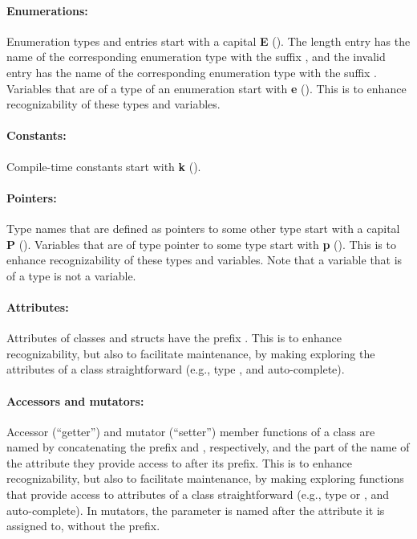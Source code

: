 \documentclass[footinclude=false,11pt,DIV11]{scrartcl}
\begin{document}
\paragraph{Enumerations:} Enumeration types and entries start with a capital
\textbf{E} (\Etype). The length entry has the name of the corresponding enumeration
type with the suffix , and the invalid entry has the name of the
corresponding enumeration type with the suffix . Variables that are of a
type of an enumeration start with \textbf{e} (\etype). This is to enhance
recognizability of these types and variables.

\paragraph{Constants:} Compile-time constants start with \textbf{k} (\ktype).

\paragraph{Pointers:} Type names that are defined as pointers to some other type start
with a capital \textbf{P} (\Ptype). Variables that are of type pointer to some
type start with \textbf{p} (\ptype). This is to enhance recognizability of these types
and variables. Note that a variable that is of a \Ptype type is not a \ptype variable.

\paragraph{Attributes:} Attributes of classes and structs have the prefix .
This is to enhance recognizability, but also to facilitate maintenance, by making
exploring the attributes of a class straightforward (e.g., type , and
auto-complete).

\paragraph{Accessors and mutators:} Accessor (``getter'') and mutator (``setter'')
member functions of a class are named by concatenating the prefix  and
, respectively, and the part of the name of the attribute they provide
access to after its  prefix. This is to enhance recognizability, but also to
facilitate maintenance, by making exploring functions that provide access to attributes
of a class straightforward (e.g., type  or , and
auto-complete). In mutators, the parameter is named after the attribute it is assigned
to, without the  prefix.
\end{document}

